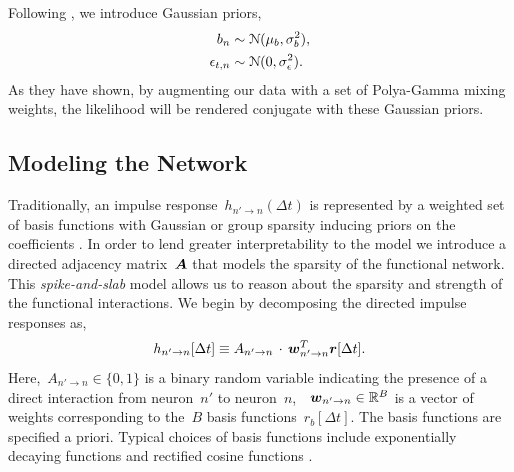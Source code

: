 \documentclass[aos]{imsart} %
\begin{document}
Following \citet{Zhou2012}, we introduce Gaussian priors,
\begin{align}
b_n&\sim\distNormal(\mu_b, \sigma_b^2), \\
\epsilon_{t,n}&\sim\distNormal(0, \sigma_\epsilon^2).
\end{align}
As they have shown, by augmenting our data with a set of Polya-Gamma mixing weights, the likelihood will be rendered conjugate with these Gaussian priors.

\subsection{Modeling the Network}
Traditionally, an impulse response~${h_{n'\to n}(\Delta t)}$ is represented by a weighted set of basis functions with Gaussian or group sparsity inducing priors on the coefficients \citep{Pillow2008}. In order to lend greater interpretability to the model we introduce a directed adjacency matrix~$\boldsymbol{A}$ that models the sparsity of the functional network. This \emph{spike-and-slab} model \citep{Mitchell1988} allows us to reason about the sparsity and strength of the functional interactions. We begin by decomposing the directed impulse responses as,
\begin{align}
\label{eqn:glm_ir}
h_{n' \to n}[\Delta t] \equiv A_{n'\to n} \,\cdot\, \bw_{n' \to n}^T \br[\Delta t].
\end{align}
Here,~${A_{n'\to n}\in\{0,1\}}$ is a binary random variable indicating the presence of a direct interaction from neuron~$n'$ to neuron~$n$,~~${\boldsymbol{w}_{n'\to n} \in \mathbb{R}^B}$ is a vector of weights corresponding to the~$B$ basis functions~${r_b[\Delta t]}$.  The basis functions are specified a priori. Typical choices of basis functions include exponentially decaying functions and rectified cosine functions \citep{Pillow2008}.
\end{document}
